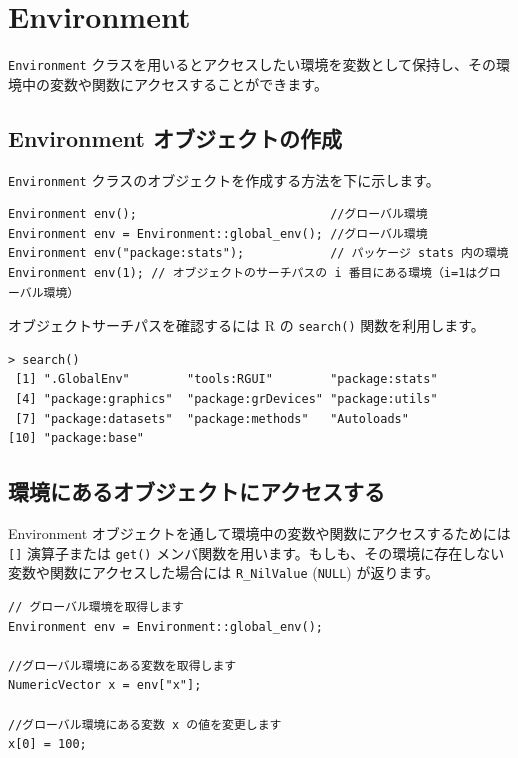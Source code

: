 \documentclass[]{book}
\begin{document}
\hypertarget{environment}{%
\chapter{Environment}\label{environment}}

\texttt{Environment} クラスを用いるとアクセスしたい環境を変数として保持し、その環境中の変数や関数にアクセスすることができます。

\hypertarget{environment-}{%
\section{Environment オブジェクトの作成}\label{environment-}}

\texttt{Environment} クラスのオブジェクトを作成する方法を下に示します。

\begin{verbatim}
Environment env();                           //グローバル環境
Environment env = Environment::global_env(); //グローバル環境
Environment env("package:stats");            // パッケージ stats 内の環境
Environment env(1); // オブジェクトのサーチパスの i 番目にある環境（i=1はグローバル環境）
\end{verbatim}

オブジェクトサーチパスを確認するには R の \texttt{search()} 関数を利用します。

\begin{verbatim}
> search()
 [1] ".GlobalEnv"        "tools:RGUI"        "package:stats"    
 [4] "package:graphics"  "package:grDevices" "package:utils"    
 [7] "package:datasets"  "package:methods"   "Autoloads"        
[10] "package:base"   
\end{verbatim}

\section{環境にあるオブジェクトにアクセスする}

Environment オブジェクトを通して環境中の変数や関数にアクセスするためには \texttt{{[}{]}} 演算子または \texttt{get()} メンバ関数を用います。もしも、その環境に存在しない変数や関数にアクセスした場合には \texttt{R\_NilValue} (\texttt{NULL}) が返ります。

\begin{verbatim}
// グローバル環境を取得します
Environment env = Environment::global_env();

//グローバル環境にある変数を取得します
NumericVector x = env["x"];

//グローバル環境にある変数 x の値を変更します
x[0] = 100;
\end{verbatim}
\end{document}
